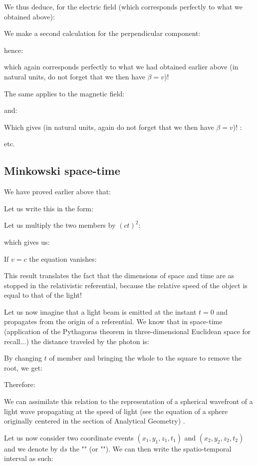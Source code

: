 	We thus deduce, for the electric field (which corresponds perfectly to what we obtained above):
	
	We make a second calculation for the perpendicular component:
	
	hence:
	
	which again corresponds perfectly to what we had obtained earlier above (in natural units, do not forget that we then have $\beta=v$)!

	The same applies to the magnetic field:
	
	and:
	
	Which gives (in natural units, again do not forget that we then have $\beta=v$)! :
	
	etc.
	
	\subsection{Minkowski space-time}
		We have proved earlier above that:
	
	Let us write this in the form:
	
	Let us multiply the two members by $(ct)^2$:
	
	which gives us:
	
	If $v=c$ the equation vanishes:
	
	This result translates the fact that the dimensions of space and time are as stopped in the relativistic referential, because the relative speed of the object is equal to that of the light!

	Let us now imagine that a light beam is emitted at the instant $t=0$ and propagates from the origin of a referential. We know that in space-time (application of the Pythagoras theorem in three-dimensional Euclidean space for recall...) the distance traveled by the photon is:
	
	By changing $t$ of member and bringing the whole to the square to remove the root, we get:
	
	Therefore:
	
	\begin{tcolorbox}[title=Remark,colframe=black,arc=10pt]
	We can assimilate this relation to the representation of a spherical wavefront of a light wave propagating at the speed of light (see the equation of a sphere originally centered in the section of Analytical Geometry) .
	\end{tcolorbox}
	Let us now consider two coordinate events $(x_1,y_1,z_1,t_1)$ and $(x_2,y_2,z_2,t_2)$ and we denote by $\mathrm{d}s$ the "" (or ""). We can then write the spatio-temporal interval as such:
	
